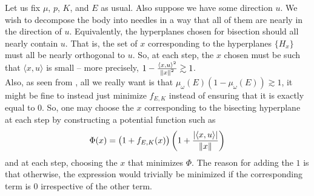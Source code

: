 \documentclass{article}
\begin{document}
		Let us fix $\mu$, $p$, $K$, and $E$ as usual. Also suppose we have some direction $u$. We wish to decompose the body into needles in a way that all of them are nearly in the direction of $u$. Equivalently, the hyperplanes chosen for bisection should all nearly contain $u$. That is, the set of $x$ corresponding to the hyperplanes $\{H_x\}$ must all be nearly orthogonal to $u$. So, at each step, the $x$ chosen must be such that $\langle x , u \rangle$ is small -- more precisely, $1 - \frac{\langle x , u \rangle^2}{\left\lVert x\right\rVert^2} \gtrsim 1$.\\
		Also, as seen from , all we really want is that $\mu_\omega(E)(1-\mu_\omega(E)) \gtrsim 1$, it might be fine to instead just minimize $f_{E,K}$ instead of ensuring that it is exactly equal to $0$. So, one may choose the $x$ corresponding to the bisecting hyperplane at each step by constructing a potential function such as
		\[ \Phi(x) = \left(1 + f_{E,K}(x)\right) \left(1 + \frac{|\langle x , u \rangle|}{\left\lVert x\right\rVert}\right) \]
		and at each step, choosing the $x$ that minimizes $\Phi$. The reason for adding the $1$ is that otherwise, the expression would trivially be minimized if the corresponding term is $0$ irrespective of the other term.



\end{document}
